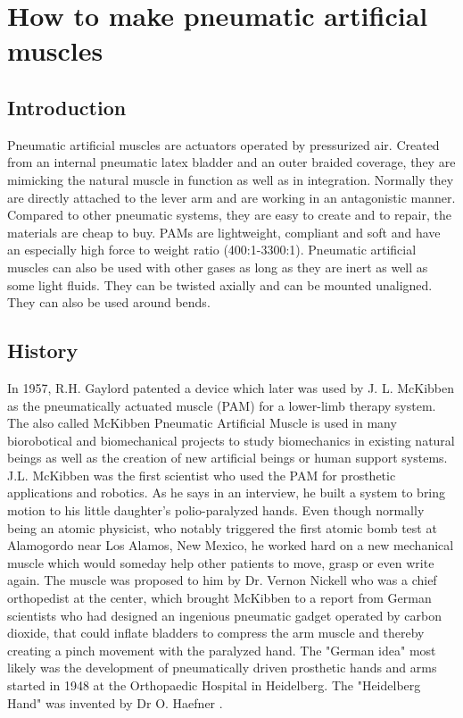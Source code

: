 \documentclass[main]{subfiles}
\begin{document}
\chapter{How to make pneumatic artificial muscles} %

\label{AppendixA} %


\section{Introduction}

Pneumatic artificial muscles are actuators operated by pressurized air. Created from an internal pneumatic latex bladder and an outer braided coverage, they are mimicking the natural muscle in function as well as in integration. Normally they are directly attached to the lever arm and are working in an antagonistic manner. Compared to other pneumatic systems, they are easy to create and to repair, the materials are cheap to buy. PAMs are lightweight, compliant and soft and have an especially high force to weight ratio (400:1-3300:1). Pneumatic artificial muscles can also be used with other gases as long as they are inert as well as some light fluids. They can be twisted axially and can be mounted unaligned. They can also be used around bends.

\section{History}

In 1957, R.H. Gaylord patented a device which later was used by J. L. McKibben as the pneumatically actuated muscle (PAM) for a lower-limb therapy system. The also called McKibben Pneumatic Artificial Muscle is used in many biorobotical and biomechanical projects to study biomechanics in existing natural beings as well as the creation of new artificial beings or human support systems. J.L. McKibben was the first scientist who used the PAM for prosthetic applications and robotics. As he says in an interview, he built a system to bring motion to his little daughter's polio-paralyzed hands. Even though normally being an atomic physicist, who notably triggered the first atomic bomb test at Alamogordo near Los Alamos, New Mexico, he worked hard on a new mechanical muscle which would someday help other patients to move, grasp or even write again. The muscle was proposed to him by Dr. Vernon Nickell who was a chief orthopedist at the center, which brought McKibben to a report from German scientists who had designed an ingenious pneumatic gadget operated by carbon dioxide, that could inflate bladders to compress the arm muscle and thereby creating a pinch movement with the paralyzed hand. The "German idea" most likely was the development of pneumatically driven prosthetic hands and arms started in 1948 at the Orthopaedic Hospital in Heidelberg. The "Heidelberg Hand" was invented by Dr O. Haefner \cite{Haefner1958}.
\end{document}
